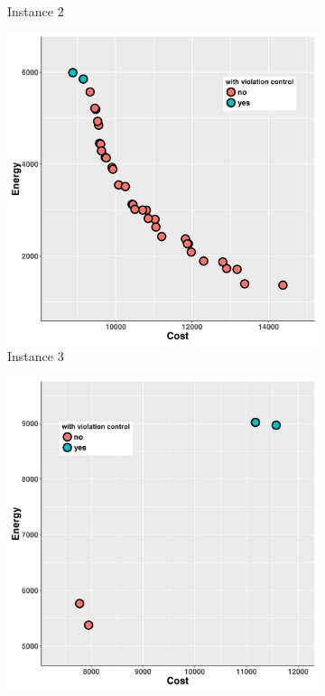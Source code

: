 \begin{figure}
\begin{subfigure}[b]{0.45\textwidth}
   \caption{Instance 2}
   \label{fig:b}
   \end{subfigure}
   \begin{subfigure}[b]{0.45\textwidth}\includegraphics[width=\textwidth]{pics/preliminary/3/evolve.png}
   \caption{Instance 3}
   \label{fig:c}
   \end{subfigure}
   \begin{subfigure}[b]{0.45\textwidth}\includegraphics[width=\textwidth]{pics/preliminary/4/evolve.png}

\end{subfigure}
\end{figure}
